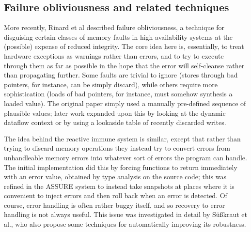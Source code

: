 \subsection{Failure obliviousness and related techniques}
More recently, Rinard et al\cite{Rinard2004} described failure
obliviousness, a technique for disguising certain classes of memory
faults in high-availability systems at the (possible) expense of
reduced integrity.  The core idea here is, essentially, to treat
hardware exceptions as warnings rather than errors, and to try to
execute through them as far as possible in the hope that the error
will self-cleanse rather than propagating further.  Some faults are
trivial to ignore (stores through bad pointers, for instance, can be
simply discard), while others require more sophistication (loads of
bad pointers, for instance, must somehow synthesis a loaded value).
The original paper simply used a manually pre-defined sequence of
plausible values; later work expanded upon this by looking at the
dynamic dataflow context\cite{Nagarajan2009} or by using a lookaside
table of recently discarded writes\cite{Rinard2005a}.

The idea behind the reactive immune system\cite{Sidiroglou2005} is
similar, except that rather than trying to discard memory operations
they instead try to convert errors from unhandleable memory errors
into whatever sort of errors the program can handle.  The initial
implementation did this by forcing functions to return immediately
with an error value, obtained by type analysis on the source code;
this was refined in the ASSURE system\cite{Sidiroglou2005} to instead
take snapshots at places where it is convenient to inject errors and
then roll back when an error is detected.  Of course, error handling
is often rather buggy itself, and so recovery to error handling is not
always useful.  This issue was investigated in detail by
S\"{u}\ss{}kraut et al.\cite{Susskraut2006}, who also propose some
techniques for automatically improving its robustness.  

